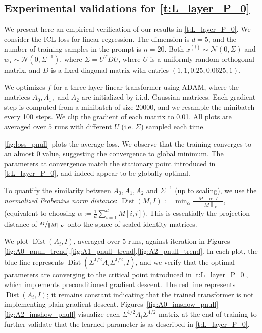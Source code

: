 \documentclass{article}
\DeclareMathOperator{\Dist}{Dist}
\newcommand{\wstar}{w_\star}
\newcommand{\tx}[1]{x^{(#1)}}
\newcommand*\lrn[1]{\left\| #1 \right\|}
\newcommand*\lrp[1]{\left( #1 \right)}
\begin{document}
\subsection{Experimental validations for \autoref{t:L_layer_P_0}}
\label{s:experiment_pnull}
We present here an empirical verification of our results in \autoref{t:L_layer_P_0}. We consider the ICL loss for linear regression. The dimension is $d=5$, and the number of training samples in the prompt is $n=20$. Both $\tx{i}\sim \mathcal{N}(0,\Sigma)$ and $\wstar \sim \mathcal{N}(0,\Sigma^{-1})$, where $\Sigma = U^T D U$, where $U$ is a uniformly random orthogonal matrix, and $D$ is a fixed diagonal matrix with entries $(1,1,0.25,0.0625,1)$. 

We optimizes $f$ for a three-layer linear transformer using ADAM, where the matrices $A_0,A_1,$ and $A_2$ are initialized by i.i.d. Gaussian matrices. Each gradient step is computed from a minibatch of size 20000, and we resample the minibatch every 100 steps. We clip the gradient of each matrix to 0.01. All plots are averaged over $5$ runs with different $U$ (i.e. $\Sigma$) sampled each time.


\autoref{fig:loss_pnull} plots the average loss. We observe that the training converges to an almost $0$ value, suggesting the convergence to global minimum. The parameters at convergence match the stationary point introduced in \autoref{t:L_layer_P_0}, and indeed appear to be globally optimal. 

To quantify the similarity between $A_0,A_1,A_2$ and $\Sigma^{-1}$ (up to scaling), we use the \emph{normalized Frobenius norm distance}: $\Dist(M,I) := \min_{\alpha}  \frac{\lrn{M - \alpha  \cdot I}}{\lrn{M}_F}$, (equivalent to choosing $\alpha := \frac{1}{d} \sum_{i=1}^d M[i,i]$). This is essentially the projection distance of $\nicefrac{M}{\lrn{M}}_F$ onto the space of scaled identity matrices. 

We plot $\Dist\lrp{A_i, I}$, averaged over $5$ runs, against iteration in Figures \ref{fig:A0_pnull_trend},\ref{fig:A1_pnull_trend},\ref{fig:A2_pnull_trend}. In each plot, the blue line represents $\Dist(\Sigma^{1/2} A_i \Sigma^{1/2},I)$, and we verify that the optimal parameters are converging to the critical point introduced in \autoref{t:L_layer_P_0}, which implements preconditioned gradient descent. The red line  represents $\Dist(A_i,I)$; it remains constant indicating that the trained transformer is not implementing plain gradient descent.  Figures~\ref{fig:A0_imshow_pnull}--\ref{fig:A2_imshow_pnull} visualize each $\Sigma^{1/2} A_i \Sigma^{1/2}$ matrix at the end of training to further validate that the learned parameter is as described in \autoref{t:L_layer_P_0}.
\end{document}
